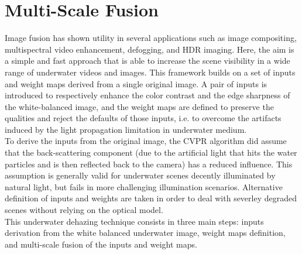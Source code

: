 \documentclass[hidelinks, 12pt]{report}
\begin{document}
\chapter{Multi-Scale Fusion}
\fancyhf{}
\fancyhead[r]{%
   \itshape
\footnotesize{\chaptermark}
   \leftmark}

\fancyfoot[RE,RO]{\footnotesize\thepage}

\justify
Image fusion has shown utility in several applications such as image compositing, multispectral video enhancement, defogging, and HDR imaging. Here, the aim is a simple and fast approach that is able to increase the scene visibility in a wide range of underwater videos and images. This framework builds on a set of inputs and weight maps derived from a single original image. A pair of inputs is introduced to respectively enhance the color contrast and the edge sharpness of the white-balanced image, and the weight maps are defined to preserve the qualities and reject the defaults of those inputs, i.e. to overcome the artifacts induced by the light propagation limitation in underwater medium.\\To derive the inputs from the original image, the CVPR algorithm\cite{vd} did assume that the back-scattering component (due to the artificial light that hits the water particles and is then reflected back to the camera) has a reduced influence. This assumption is generally valid for underwater scenes decently illuminated by natural light, but fails in more challenging illumination scenarios. Alternative definition of inputs and weights are taken in order to deal with severley degraded scenes without relying on the optical model.\\ This underwater dehazing technique consists in three main steps: inputs derivation from the white balanced underwater image, weight maps definition, and multi-scale fusion of the inputs and weight maps.
\end{document}
